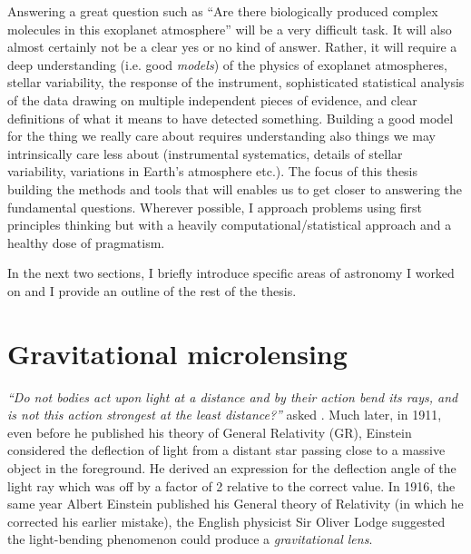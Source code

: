 \documentclass[12pt,dvipsnames]{report}
\begin{document}
Answering a great question such as ``Are there biologically produced complex
molecules in this exoplanet atmosphere'' will be a very difficult task. 
It will also almost certainly not be a clear yes or no kind of answer. Rather, it will
require a deep understanding (i.e. good \emph{models}) of the physics of
exoplanet atmospheres, stellar variability, the response of the instrument,
sophisticated statistical analysis of the data drawing on multiple independent
pieces of evidence, and clear definitions of what it means to have detected
something. Building a good model for the thing we really care about requires
understanding also things we may intrinsically care less about
(instrumental systematics, details of stellar variability, variations in
Earth's atmosphere etc.).
The focus of this thesis building the methods and tools that will enables us to 
get closer to answering the fundamental questions.
Wherever possible, I approach problems using first principles thinking 
but with a heavily computational/statistical approach and a healthy dose of pragmatism. 

In the next two sections, I briefly introduce specific areas of astronomy I worked on 
and I provide an outline of the rest of the thesis.

\section{Gravitational microlensing}
\emph{``Do not bodies act upon light at a distance and by their action bend its rays,
    and is not this action strongest at the least distance?''} asked \citet{Newton1704}.
Much later, in 1911, even before he published his theory of General Relativity (GR), Einstein
considered the deflection of light from a distant star passing close
to a massive object in the foreground. He derived an expression for the deflection 
angle of the light ray which was off by a factor of 2 relative to the correct value.
In 1916, the same year Albert Einstein published his General theory of Relativity 
(in which he corrected his earlier mistake),
the English physicist Sir Oliver Lodge suggested the light-bending phenomenon could produce
a \emph{gravitational lens}. 
\end{document}

